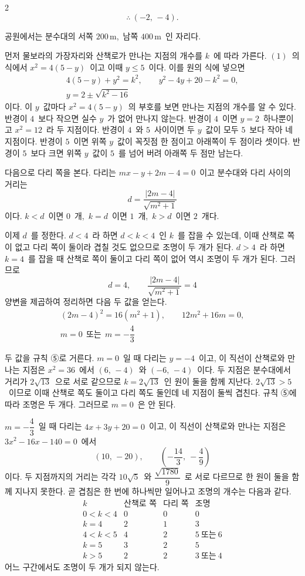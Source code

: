 \documentclass[10pt,fleqn]{article}
\begin{document}
\begin{multicols*}{2}
$$\therefore\ (-2,\,-4).$$

공원에서는 분수대의 서쪽 $200\,\mathrm{m}$,\ 남쪽 $400\,\mathrm{m}$\ 인 자리다.

 먼저 물보라의 가장자리와 산책로가 만나는 지점의 개수를 $k$\ 에 따라 가른다. $(1)$\ 의 식에서 $x^{2}=4(5-y)$\ 이고 이때 $y\le 5$\ 이다. 이를 원의 식에 넣으면
\begin{gather*}
4(5-y)+y^{2}=k^{2},\qquad y^{2}-4y+20-k^{2}=0,\\[4pt]
y=2\pm\sqrt{k^{2}-16}
\end{gather*}
이다. 이 $y$\ 값마다 $x^{2}=4(5-y)$\ 의 부호를 보면 만나는 지점의 개수를 알 수 있다. 반경이 $4$\ 보다 작으면 실수 $y$\ 가 없어 만나지 않는다. 반경이 $4$\ 이면 $y=2$\ 하나뿐이고 $x^{2}=12$\ 라 두 지점이다. 반경이 $4$\ 와 $5$\ 사이이면 두 $y$\ 값이 모두 $5$\ 보다 작아 네 지점이다. 반경이 $5$\ 이면 위쪽 $y$\ 값이 꼭짓점 한 점이고 아래쪽이 두 점이라 셋이다. 반경이 $5$\ 보다 크면 위쪽 $y$\ 값이 $5$\ 를 넘어 버려 아래쪽 두 점만 남는다.

다음으로 다리 쪽을 본다. 다리는 $mx-y+2m-4=0$\ 이고 분수대와 다리 사이의 거리는
$$d=\dfrac{|2m-4|}{\sqrt{m^{2}+1}}$$
이다. $k<d$\ 이면 $0$\ 개,\ $k=d$\ 이면 $1$\ 개,\ $k>d$\ 이면 $2$\ 개다.

이제 $d$\ 를 정한다. $d<4$\ 라 하면 $d<k<4$\ 인 $k$\ 를 잡을 수 있는데, 이때 산책로 쪽이 없고 다리 쪽이 둘이라 겹칠 것도 없으므로 조명이 두 개가 된다. $d>4$\ 라 하면 $k=4$\ 를 잡을 때 산책로 쪽이 둘이고 다리 쪽이 없어 역시 조명이 두 개가 된다. 그러므로
$$d=4,\qquad \dfrac{|2m-4|}{\sqrt{m^{2}+1}}=4$$
양변을 제곱하여 정리하면 다음 두 값을 얻는다.
\begin{gather*}
(2m-4)^{2}=16(m^{2}+1),\qquad 12m^{2}+16m=0,\\[4pt]
m=0\ \ \text{또는}\ \ m=-\dfrac43
\end{gather*}

두 값을 규칙 ⑤로 거른다. $m=0$\ 일 때 다리는 $y=-4$\ 이고, 이 직선이 산책로와 만나는 지점은 $x^{2}=36$\ 에서 $(6,\,-4)$\ 와 $(-6,\,-4)$\ 이다. 두 지점은 분수대에서 거리가 $2\sqrt{13}$\ 으로 서로 같으므로 $k=2\sqrt{13}$\ 인 원이 둘을 함께 지난다. $2\sqrt{13}>5$\ 이므로 이때 산책로 쪽도 둘이고 다리 쪽도 둘인데 네 지점이 둘씩 겹친다. 규칙 ⑤에 따라 조명은 두 개다. 그러므로 $m=0$\ 은 안 된다.

$m=-\dfrac43$\ 일 때 다리는 $4x+3y+20=0$\ 이고, 이 직선이 산책로와 만나는 지점은 $3x^{2}-16x-140=0$\ 에서
$$(10,\,-20),\qquad \left(-\dfrac{14}{3},\ -\dfrac49\right)$$
이다. 두 지점까지의 거리는 각각 $10\sqrt5$\ 와 $\dfrac{\sqrt{1780}}{9}$\ 로 서로 다르므로 한 원이 둘을 함께 지나지 못한다. 곧 겹침은 한 번에 하나씩만 일어나고 조명의 개수는 다음과 같다.
$$\begin{array}{c|ccc}
k & \text{산책로 쪽} & \text{다리 쪽} & \text{조명}\\\hline
0<k<4 & 0 & 0 & 0\\
k=4 & 2 & 1 & 3\\
4<k<5 & 4 & 2 & 5\ \text{또는}\ 6\\
k=5 & 3 & 2 & 5\\
k>5 & 2 & 2 & 3\ \text{또는}\ 4
\end{array}$$
어느 구간에서도 조명이 두 개가 되지 않는다.


\end{multicols*}
\end{document}
